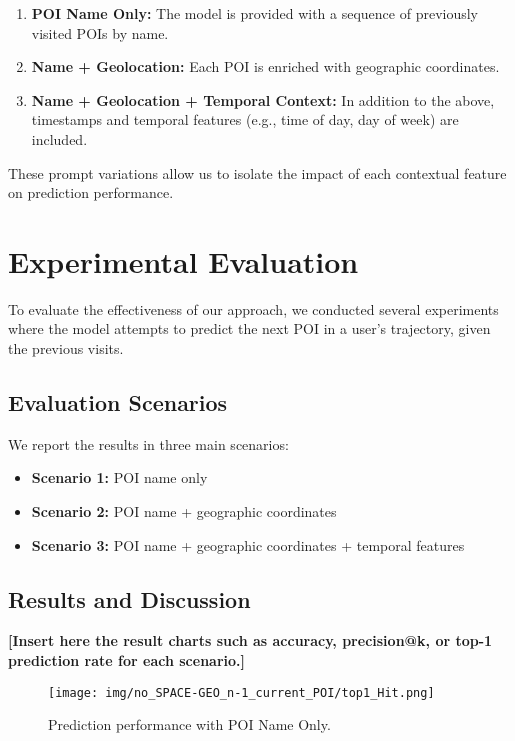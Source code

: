 \documentclass[a4paper,12pt]{article}
\begin{document}
\begin{enumerate}
    \item \textbf{POI Name Only:} The model is provided with a sequence of previously visited POIs by name.
    \item \textbf{Name + Geolocation:} Each POI is enriched with geographic coordinates.
    \item \textbf{Name + Geolocation + Temporal Context:} In addition to the above, timestamps and temporal features (e.g., time of day, day of week) are included.
\end{enumerate}

These prompt variations allow us to isolate the impact of each contextual feature on prediction performance.

\section{Experimental Evaluation}

To evaluate the effectiveness of our approach, we conducted several experiments where the model attempts to predict the next POI in a user's trajectory, given the previous visits.

\subsection{Evaluation Scenarios}

We report the results in three main scenarios:

\begin{itemize}
    \item \textbf{Scenario 1:} POI name only
    \item \textbf{Scenario 2:} POI name + geographic coordinates
    \item \textbf{Scenario 3:} POI name + geographic coordinates + temporal features
\end{itemize}

\subsection{Results and Discussion}

\textbf{[Insert here the result charts such as accuracy, precision@k, or top-1 prediction rate for each scenario.]}

\begin{figure}[H]
    \centering
    \texttt{[image: img/no\_SPACE-GEO\_n-1\_current\_POI/top1\_Hit.png]}
    \caption{Prediction performance with POI Name Only.}
\end{figure}
\end{document}
